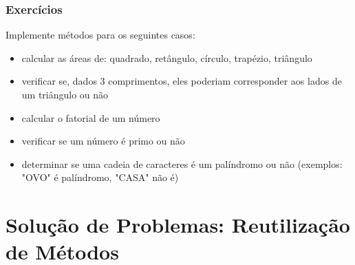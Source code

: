 \documentclass[xcolor={dvipsnames,table},aspectratio=169]{beamer}
\begin{document}
\begin{frame}\frametitle{Exercícios}
Implemente métodos para os seguintes casos:
\begin{itemize}
	\item calcular as áreas de: quadrado, retângulo, círculo, trapézio, triângulo
	\item verificar se, dados 3 comprimentos, eles poderiam corresponder aos lados de um triângulo ou não
	\item calcular o fatorial de um número
	\item verificar se um número é primo ou não
        \item determinar se uma cadeia de caracteres é um palíndromo ou não (exemplos: "OVO" é palíndromo, "CASA" não é)
\end{itemize}
\end{frame}

\section{Solução de Problemas: Reutilização de Métodos}
\end{document}
